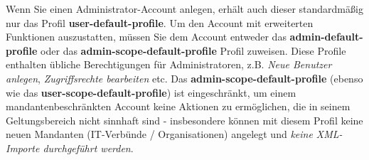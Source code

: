 \documentclass[a4paper,10pt]{book}
\begin{document}
Wenn Sie einen Administrator-Account anlegen, erhält auch dieser standardmäßig
nur das Profil \textbf{user-default-profile}. Um den Account mit erweiterten
Funktionen auszustatten, müssen Sie dem Account entweder das
\textbf{admin-default-profile} oder das \textbf{admin-scope-default-profile}
Profil zuweisen. Diese Profile enthalten übliche Berechtigungen für
Administratoren, z.B. \textit{Neue Benutzer anlegen}, \textit{Zugriffsrechte
bearbeiten} etc. Das \textbf{admin-scope-default-profile} (ebenso wie das
\textbf{user-scope-default-profile}) ist eingeschränkt, um einem
mandantenbeschränkten Account keine Aktionen zu ermöglichen, die in seinem
Geltungsbereich nicht sinnhaft sind - insbesondere können mit diesem Profil
keine neuen Mandanten (IT-Verbünde / Organisationen) angelegt und \textit{keine
XML-Importe durchgeführt werden}.
\end{document}
